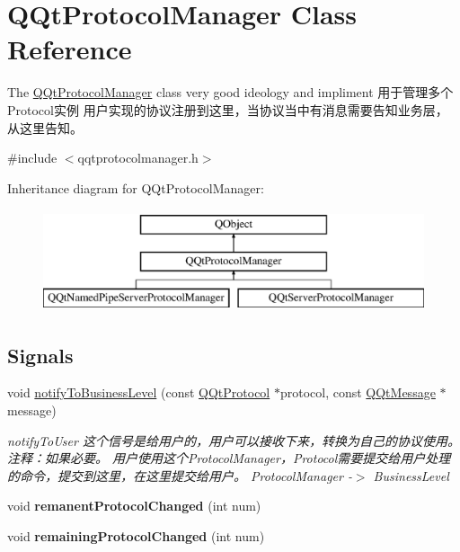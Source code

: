 \hypertarget{class_q_qt_protocol_manager}{}\section{Q\+Qt\+Protocol\+Manager Class Reference}
\label{class_q_qt_protocol_manager}


The \mbox{\hyperlink{class_q_qt_protocol_manager}{Q\+Qt\+Protocol\+Manager}} class very good ideology and impliment 用于管理多个\+Protocol实例 用户实现的协议注册到这里，当协议当中有消息需要告知业务层，从这里告知。  




{\ttfamily \#include $<$qqtprotocolmanager.\+h$>$}

Inheritance diagram for Q\+Qt\+Protocol\+Manager\+:\begin{figure}[H]
\begin{center}
\leavevmode
\includegraphics[height=3.000000cm]{class_q_qt_protocol_manager}
\end{center}
\end{figure}
\subsection*{Signals}
\begin{DoxyCompactItemize}
\item 
void \mbox{\hyperlink{class_q_qt_protocol_manager_aac4faf21da374d2371f3ecc25324c5ed}{notify\+To\+Business\+Level}} (const \mbox{\hyperlink{class_q_qt_protocol}{Q\+Qt\+Protocol}} $\ast$protocol, const \mbox{\hyperlink{class_q_qt_message}{Q\+Qt\+Message}} $\ast$message)
\begin{DoxyCompactList}\small\item\em notify\+To\+User 这个信号是给用户的，用户可以接收下来，转换为自己的协议使用。注释：如果必要。 用户使用这个\+Protocol\+Manager，\+Protocol需要提交给用户处理的命令，提交到这里，在这里提交给用户。 Protocol\+Manager -\/$>$ Business\+Level \end{DoxyCompactList}\item 
\mbox{\label{class_q_qt_protocol_manager_a5df5b4446ea8265671812ab8d7d7252f}} 
void {\bfseries remanent\+Protocol\+Changed} (int num)
\item 
\mbox{\label{class_q_qt_protocol_manager_ac5c8d1d4f008a425e91e62fd5986d80a}} 
void {\bfseries remaining\+Protocol\+Changed} (int num)
\end{DoxyCompactItemize}
